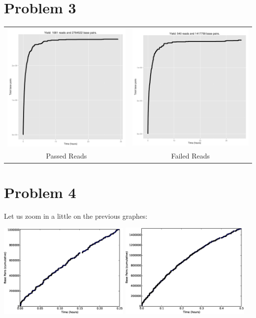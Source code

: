 \documentclass[11pt]{article}
\begin{document}
\section*{Problem 3}
\begin{tabular}{cc}
\includegraphics[width=.48\textwidth]{cumnucpass}
&
\includegraphics[width=.48\textwidth]{cumnucfail}
\\
Passed Reads
&
Failed Reads
\end{tabular}
\section*{Problem 4}


Let us zoom in a little on the previous graphes: 


\includegraphics[width=0.48\textwidth]{q4qh}
\includegraphics[width=0.48\textwidth]{q4hh}
\end{document}
